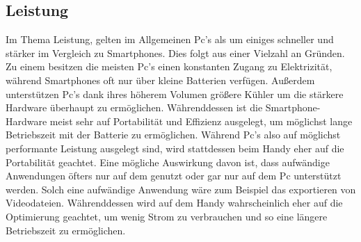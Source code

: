 \subsection{Leistung}\label{PcVsPhone:Leistung} \myCheckmark
Im Thema Leistung, gelten im Allgemeinen Pc's als um einiges schneller und stärker im Vergleich zu Smartphones. 
	Dies folgt aus einer Vielzahl an Gründen. Zu einem besitzen die meisten Pc's einen konstanten Zugang zu Elektrizität, während Smartphones oft nur über kleine Batterien verfügen. Außerdem unterstützen Pc's dank ihres höherem Volumen größere Kühler um die stärkere Hardware überhaupt zu ermöglichen.\newline%
Währenddessen ist die Smartphone-Hardware meist sehr auf Portabilität und Effizienz ausgelegt, um möglichst lange Betriebszeit mit der Batterie zu ermöglichen.\newline%
Während Pc's also auf möglichst performante Leistung ausgelegt sind, wird stattdessen beim Handy eher auf die Portabilität geachtet.\newline%
Eine mögliche Auswirkung davon ist, dass aufwändige Anwendungen öfters nur auf dem genutzt oder gar nur auf dem Pc unterstützt werden. Solch eine aufwändige Anwendung wäre zum Beispiel das exportieren von Videodateien. Währenddessen wird auf dem Handy wahrscheinlich eher auf die Optimierung geachtet, um wenig Strom zu verbrauchen und so eine längere Betriebszeit zu ermöglichen.
